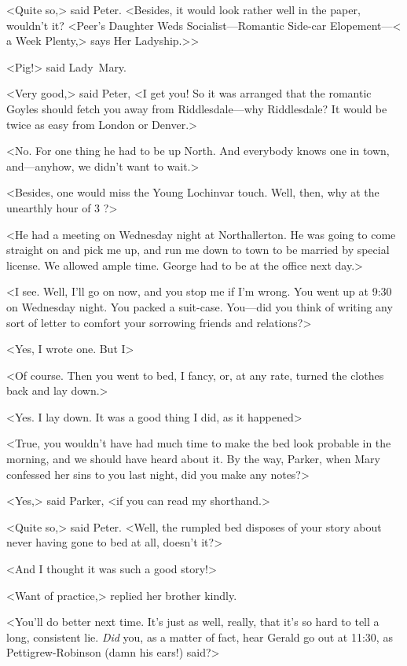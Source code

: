 <Quite so,> said Peter. <Besides, it would look rather well in the paper, wouldn't it? <Peer's Daughter Weds Socialist—Romantic Side-car Elopement—< a Week Plenty,> says Her Ladyship.>>

<Pig!> said Lady~Mary.

<Very good,> said Peter, <I get you! So it was arranged that the romantic Goyles should fetch you away from Riddlesdale—why Riddlesdale? It would be twice as easy from London or Denver.>

<No. For one thing he had to be up North. And everybody knows one in town, and—anyhow, we didn't want to wait.>

<Besides, one would miss the Young Lochinvar touch. Well, then, why at the unearthly hour of 3 ?>

<He had a meeting on Wednesday night at Northallerton. He was going to come straight on and pick me up, and run me down to town to be married by special license. We allowed ample time. George had to be at the office next day.>

<I see. Well, I'll go on now, and you stop me if I'm wrong. You went up at 9:30 on Wednesday night. You packed a suit-case. You—did you think of writing any sort of letter to comfort your sorrowing friends and relations?>

<Yes, I wrote one. But I\longdash>

<Of course. Then you went to bed, I fancy, or, at any rate, turned the clothes back and lay down.>

<Yes. I lay down. It was a good thing I did, as it happened\longdash>

<True, you wouldn't have had much time to make the bed look probable in the morning, and we should have heard about it. By the way, Parker, when Mary confessed her sins to you last night, did you make any notes?>

<Yes,> said Parker, <if you can read my shorthand.>

<Quite so,> said Peter. <Well, the rumpled bed disposes of your story about never having gone to bed at all, doesn't it?>

<And I thought it was such a good story!>

<Want of practice,> replied her brother kindly.

<You'll do better next time. It's just as well, really, that it's so hard to tell a long, consistent lie. \emph{Did} you, as a matter of fact, hear Gerald go out at 11:30, as Pettigrew-Robinson (damn his ears!) said?>

